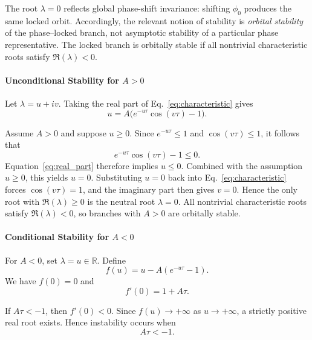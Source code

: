 \documentclass[11pt,a4paper]{article}
\begin{document}
            The root $\lambda=0$ reflects global phase-shift invariance: shifting $\phi_0$ produces the same locked orbit. Accordingly, the relevant notion of stability is \emph{orbital stability} of the phase--locked branch, not asymptotic stability of a particular phase representative. The locked branch is orbitally stable if all nontrivial characteristic roots satisfy $\Re(\lambda)<0$.

        \paragraph{Unconditional Stability for \texorpdfstring{$A>0$}{A>0}}

            Let $\lambda=u+iv$.
            Taking the real part of Eq.~\ref{eq:characteristic} gives
            \begin{equation}
                u=A\big(e^{-u\tau}\cos(v\tau)-1\big).
                \label{eq:real_part}
            \end{equation}

            Assume $A>0$ and suppose $u\ge0$.
            Since $e^{-u\tau}\le1$ and $\cos(v\tau)\le1$, it follows that
            \[
                e^{-u\tau}\cos(v\tau)-1 \le 0.
            \]
            Equation~\eqref{eq:real_part} therefore implies $u\le0$.
            Combined with the assumption $u\ge0$, this yields $u=0$.
            Substituting $u=0$ back into Eq.~\eqref{eq:characteristic} forces $\cos(v\tau)=1$, and the imaginary part then gives $v=0$.
            Hence the only root with $\Re(\lambda)\ge0$ is the neutral root $\lambda=0$.
            All nontrivial characteristic roots satisfy $\Re(\lambda)<0$, so branches with $A>0$ are orbitally stable.

        \paragraph{Conditional Stability for \texorpdfstring{$A<0$}{A<0}}

            For $A<0$, set $\lambda=u\in\mathbb{R}$.
            Define
            \[
                f(u)=u-A(e^{-u\tau}-1).
            \]
            We have $f(0)=0$ and
            \[
                f'(0)=1+A\tau.
            \]

            If $A\tau<-1$, then $f'(0)<0$.
            Since $f(u)\to+\infty$ as $u\to+\infty$, a strictly positive real root exists.
            Hence instability occurs when
            \begin{equation}
                A\tau<-1.
                \label{eq:stability_window}
            \end{equation}
\end{document}
